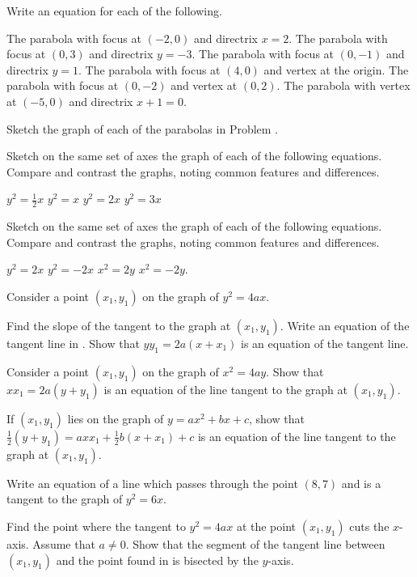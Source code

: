 \begin{exercises}

Write an equation for each of the following.
\begin{exenum}
\sx
The parabola with focus at $(-2,0)$ and directrix $x=2$.
\sx
The parabola with focus at $(0,3)$ and directrix $y=-3$.
\sx
The parabola with focus at $(0,-1)$ and directrix $y=1$.
\sx
The parabola with focus at $(4,0)$ and vertex at the origin.
\sx
The parabola with focus at $(0,-2)$ and vertex at $(0,2)$.
\sx
The parabola with vertex at $(-5,0)$ and directrix $x+1=0$.
\end{exenum}

Sketch the graph of each of the parabolas in Problem .

Sketch on the same set of axes the graph of each of the
following equations.
Compare and contrast the graphs,
noting common features and differences.
\begin{exenum}
\sx
$y^2 = \frac12 x$
\sx
$y^2 = x$
\sx
$y^2 = 2x$
\sx
$y^2 = 3x$
\end{exenum}

Sketch on the same set of axes the graph of each of the
following equations.
Compare and contrast the graphs,
noting common features and differences.
\begin{exenum}
\sx
$y^2 = 2x$
\sx
$y^2 = -2x$
\sx
$x^2 = 2y$
\sx
$x^2 = -2y$.
\end{exenum}

Consider a point $(x_1,y_1)$ on the graph of
$y^2 = 4ax$.
\begin{exenum}
\sx
{}
Find the slope of the tangent to the graph at $(x_1,y_1)$.
\sx
Write an equation of the tangent line in .
\sx
Show that $yy_1 = 2a(x+x_1)$ is an equation of
the tangent line.
\end{exenum}

Consider a point $(x_1,y_1)$ on the graph of $x^2 = 4ay$.
Show that $xx_1 = 2a(y+y_1)$ is an equation of the
line tangent to the graph at $(x_1,y_1)$.

If $(x_1,y_1)$ lies on the graph of $y = ax^2 + bx + c$,
show that $\frac12(y + y_1) = axx_1 + \frac12b(x + x_1) + c$
is an equation of the line tangent to the graph at $(x_1,y_1)$.

Write an equation of a line which passes through the point
$(8,7)$ and is a tangent to the graph of $y^2 = 6x$.

\begin{exenum}
\sx
{}
Find the point where the tangent to $y^2 = 4ax$
at the point $(x_1,y_1)$ cuts the $x$-axis.
Assume that $a \ne 0$.
\sx
Show that the segment of the tangent line between
$(x_1,y_1)$ and the point found in 
is bisected by the $y$-axis.
\end{exenum}


\end{exercises}
